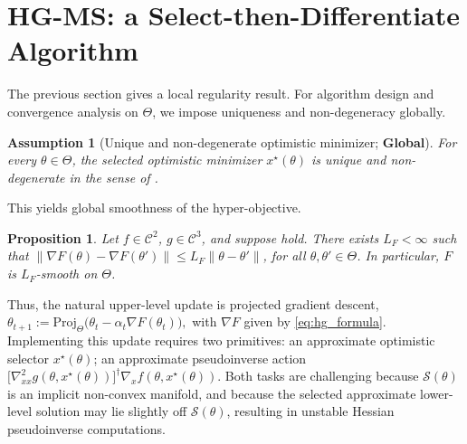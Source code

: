 \documentclass{article}
\DeclareRobustCommand{\stagecirc}[1]{%
  \tikz[baseline=(char.base)]{%
    \node[draw,circle,inner sep=0pt,minimum size=1.5ex] (char) {\scriptsize #1};%
  }%
}
\theoremstyle{normaltheorem}
\newtheorem{proposition}[proposition]{Proposition}
\newtheorem{assumption}{Assumption}
\newcommand{\calS}{\mathcal{S}}
\begin{document}
	



\section{\textsc{HG-MS}: a Select-then-Differentiate Algorithm}\label{sec:alg}

The previous section gives a local regularity result. For algorithm design and convergence analysis on $\Theta$, we impose uniqueness and non-degeneracy globally.

\begin{tcolorbox}[colback=gray!20, colframe=gray!50, boxrule=0pt, arc=0mm, left=0mm, right=0mm, top=0mm, bottom=0mm]
\begin{assumption}[Unique and non-degenerate optimistic minimizer; \textbf{Global}]\label{ass:unique_min}
For every $\theta\in\Theta$, the selected optimistic minimizer $x^\star(\theta)$ is unique and non-degenerate in the sense of .
\end{assumption}
\end{tcolorbox}

This yields global smoothness of the hyper-objective.

\begin{proposition}\label{prop:F-smooth}
Let $f \in \mathcal C^2$, $g \in \mathcal C^3$, and suppose  hold. There exists $L_F<\infty$ such that $\|\nabla F(\theta)-\nabla F(\theta')\|\le L_F\|\theta-\theta'\|$, for all $\theta,\theta'\in\Theta$. In particular, $F$ is $L_F$-smooth on $\Theta$.
\end{proposition}

Thus, the natural upper-level update is projected gradient descent, $\theta_{t+1}:=\mathrm{Proj}_{\Theta}\big(\theta_t-\alpha_t\nabla F(\theta_t)\big),$ with $\nabla F$ given by \cref{eq:hg_formula}. Implementing this update requires two primitives: \stagecirc{A} an approximate optimistic selector $x^\star(\theta)$;
    \stagecirc{B} an approximate pseudoinverse action
    $\big[\nabla^2_{xx}g(\theta,x^\star(\theta))\big]^\dagger\nabla_x f(\theta,x^\star(\theta))$.
Both tasks are challenging because $\calS(\theta)$ is an implicit non-convex manifold, and because the selected approximate lower-level solution may lie slightly off $\calS(\theta)$, resulting in unstable Hessian pseudoinverse computations.
\end{document}
